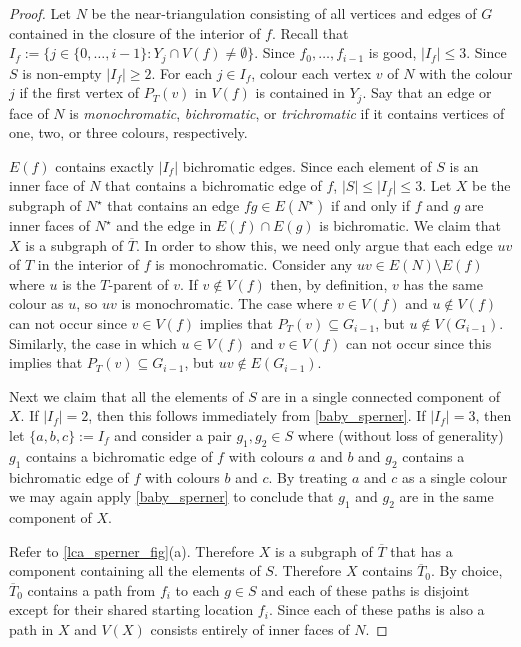 \documentclass{patmorin}
\begin{document}
\begin{proof}
  Let $N$ be the near-triangulation consisting of all vertices and edges of $G$ contained in the closure of the interior of $f$.  Recall that $I_f:=\{j\in\{0,\ldots,i-1\}: Y_j\cap V(f)\neq\emptyset\}$.  Since $f_0,\ldots,f_{i-1}$ is good, $|I_f|\le 3$.  Since $S$ is non-empty $|I_f|\ge 2$.  For each $j\in I_f$, colour each vertex $v$ of $N$ with the colour $j$ if the first vertex of $P_{T}(v)$ in $V(f)$ is contained in $Y_j$.  Say that an edge or face of $N$ is \emph{monochromatic}, \emph{bichromatic}, or \emph{trichromatic} if it contains vertices of one, two, or three colours, respectively.

  $E(f)$ contains exactly $|I_f|$ bichromatic edges.  Since each element of $S$ is an inner face of $N$ that contains a bichromatic edge of $f$, $|S|\le |I_f|\le 3$.  Let $X$ be the subgraph of $N^\star$ that contains an edge $fg\in E(N^\star)$ if and only if $f$ and $g$ are inner faces of $N^\star$ and the edge in $E(f)\cap E(g)$ is bichromatic.  We claim that $X$ is a subgraph of $\overline{T}$.  In order to show this, we need only argue that each edge $uv$ of $T$ in the interior of $f$ is monochromatic.  Consider any $uv\in E(N)\setminus E(f)$ where $u$ is the $T$-parent of $v$.  If $v\not\in V(f)$ then, by definition, $v$ has the same colour as $u$, so $uv$ is monochromatic. The case where $v\in V(f)$ and $u\not\in V(f)$ can not occur since $v\in V(f)$ implies that $P_T(v)\subseteq G_{i-1}$, but $u\not\in V(G_{i-1})$.  Similarly, the case in which $u\in V(f)$ and $v\in V(f)$ can not occur since this implies that $P_T(v)\subseteq G_{i-1}$, but $uv\not\in E(G_{i-1})$.

  Next we claim that all the elements of $S$ are in a single connected component of $X$.  If $|I_f|=2$, then this follows immediately from \cref{baby_sperner}.  If $|I_f|=3$, then let $\{a,b,c\}:=I_f$ and consider a pair $g_1,g_2\in S$ where (without loss of generality) $g_1$ contains a bichromatic edge of $f$ with colours $a$ and $b$ and $g_2$ contains a bichromatic edge of $f$ with colours $b$ and $c$.  By treating $a$ and $c$ as a single colour we may again apply \cref{baby_sperner} to conclude that $g_1$ and $g_2$ are in the same component of $X$.

  Refer to \cref{lca_sperner_fig}(a).
  Therefore $X$ is a subgraph of $\overline{T}$ that has a component containing all the elements of $S$. Therefore $X$ contains $\overline{T}_0$.  By choice, $\overline{T}_0$ contains a path from $f_i$ to each $g\in S$ and each of these paths is disjoint except for their shared starting location $f_i$. Since each of these paths is also a path in $X$ and $V(X)$ consists entirely of inner faces of $N$.


\end{proof}
\end{document}
